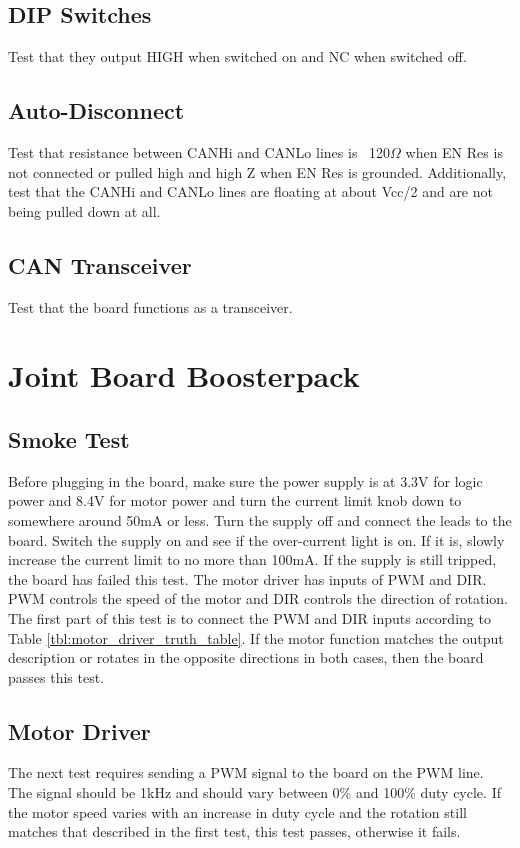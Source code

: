 \documentclass[12pt,letterpaper]{article}
\begin{document}
	\subsection{DIP Switches}
	Test that they output HIGH when switched on and NC when switched off.
	
	\subsection{Auto-Disconnect}
	Test that resistance between CANHi and CANLo lines is ~120$\Omega$ when EN Res is not connected or pulled high and high Z when EN Res is grounded. Additionally, test that the CANHi and CANLo lines are floating at about Vcc/2 and are not being pulled down at all.
	
	\subsection{CAN Transceiver}
	Test that the board functions as a transceiver.
	
	\newpage
	\section{Joint Board Boosterpack}
	\subsection{Smoke Test}
	Before plugging in the board, make sure the power supply is at 3.3V for logic power and 8.4V for motor power and turn the current limit knob down to somewhere around 50mA or less. Turn the supply off and connect the leads to the board. Switch the supply on and see if the over-current light is on. If it is, slowly increase the current limit to no more than 100mA. If the supply is still tripped, the board has failed this test.
	\label{sec:jbbp_md}
	The motor driver has inputs of PWM and DIR. PWM controls the speed of the motor and DIR controls the direction of rotation. The first part of this test is to connect the PWM and DIR inputs according to Table \ref{tbl:motor_driver_truth_table}. If the motor function matches the output description or rotates in the opposite directions in both cases, then the board passes this test.
	
	\subsection{Motor Driver}
	\label{sec:jbbp_md}
	The next test requires sending a PWM signal to the board on the PWM line. The signal should be 1kHz and should vary between 0\% and 100\% duty cycle. If the motor speed varies with an increase in duty cycle and the rotation still matches that described in the first test, this test passes, otherwise it fails.
	
\end{document}
